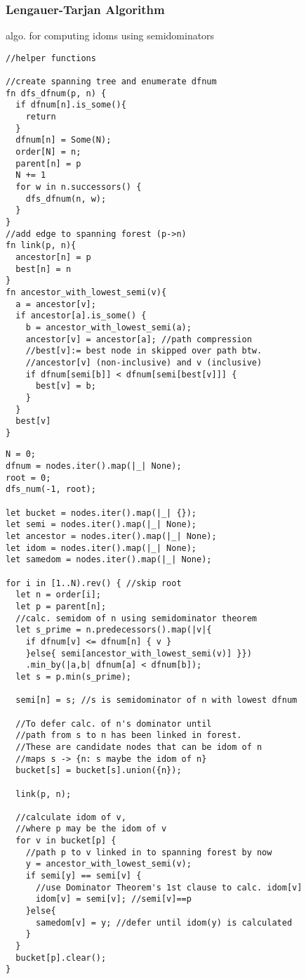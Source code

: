 \documentclass[8pt]{extarticle}
\begin{document}
\begin{multicols*}{2}
  \subsubsection{Lengauer-Tarjan Algorithm}

  algo. for computing idoms using semidominators

\begin{verbatim}
//helper functions

//create spanning tree and enumerate dfnum
fn dfs_dfnum(p, n) {
  if dfnum[n].is_some(){
    return
  }
  dfnum[n] = Some(N);
  order[N] = n;
  parent[n] = p
  N += 1
  for w in n.successors() {
    dfs_dfnum(n, w);
  }
}
//add edge to spanning forest (p->n)
fn link(p, n){
  ancestor[n] = p
  best[n] = n
}
fn ancestor_with_lowest_semi(v){
  a = ancestor[v];
  if ancestor[a].is_some() {
    b = ancestor_with_lowest_semi(a);
    ancestor[v] = ancestor[a]; //path compression
    //best[v]:= best node in skipped over path btw.
    //ancestor[v] (non-inclusive) and v (inclusive)
    if dfnum[semi[b]] < dfnum[semi[best[v]]] {
      best[v] = b;
    }
  }
  best[v]
}
\end{verbatim}
  
\begin{verbatim}
N = 0;
dfnum = nodes.iter().map(|_| None);
root = 0;
dfs_num(-1, root);

let bucket = nodes.iter().map(|_| {});
let semi = nodes.iter().map(|_| None);
let ancestor = nodes.iter().map(|_| None);
let idom = nodes.iter().map(|_| None);
let samedom = nodes.iter().map(|_| None);

for i in [1..N).rev() { //skip root
  let n = order[i];
  let p = parent[n];
  //calc. semidom of n using semidominator theorem
  let s_prime = n.predecessors().map(|v|{
    if dfnum[v] <= dfnum[n] { v }
    }else{ semi[ancestor_with_lowest_semi(v)] }})
    .min_by(|a,b| dfnum[a] < dfnum[b]);
  let s = p.min(s_prime);

  semi[n] = s; //s is semidominator of n with lowest dfnum

  //To defer calc. of n's dominator until
  //path from s to n has been linked in forest.
  //These are candidate nodes that can be idom of n
  //maps s -> {n: s maybe the idom of n}
  bucket[s] = bucket[s].union({n});

  link(p, n);

  //calculate idom of v,
  //where p may be the idom of v
  for v in bucket[p] {
    //path p to v linked in to spanning forest by now
    y = ancestor_with_lowest_semi(v);
    if semi[y] == semi[v] {
      //use Dominator Theorem's 1st clause to calc. idom[v]
      idom[v] = semi[v]; //semi[v]==p
    }else{
      samedom[v] = y; //defer until idom(y) is calculated
    }
  }
  bucket[p].clear();
}


\end{verbatim}
\end{multicols*}
\end{document}
